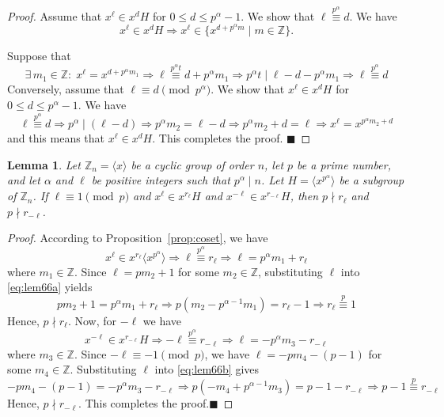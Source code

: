 \documentclass[12pt]{article}
\newtheorem{lem}[formula]{Lemma}
\begin{document}
  \begin{proof}
  	Assume that $x^\ell\in x^dH$ for $0\le d\le p^\alpha-1$. We show that $\ell\stackrel{p^\alpha}{\equiv} d$. We have
  	\[
  	x^\ell\in x^dH
  	\Longrightarrow
  	x^\ell\in\{x^{d+p^\alpha m}\mid m\in\mathbb Z\}.
  	\]
  	
  \noindent	Suppose that
  	\[
  	\exists\,m_1\in\mathbb Z:\;
  	x^\ell=x^{d+p^\alpha m_1}
  	\Longrightarrow
  	\ell \overset{p^\alpha t}{\equiv} d+p^\alpha m_1
  	\Longrightarrow
  	p^\alpha t\mid\ell-d-p^\alpha m_1
  	\Longrightarrow
  	\ell\stackrel{p^\alpha}{\equiv} d
  	\]
  \noindent	Conversely, assume that
  $\ell\equiv d\pmod{p^\alpha}$. We show that $x^\ell\in x^dH$ for $0\le d\le p^\alpha-1$. We have
  	\[
  	\ell\stackrel{p^\alpha}{\equiv} d
  	\Longrightarrow
  	p^\alpha\mid(\ell-d)
  	\Longrightarrow
  	p^\alpha m_2=\ell-d
  	\Longrightarrow
  	p^\alpha m_2+d=\ell
  	\Longrightarrow
  	x^\ell=x^{p^\alpha m_2+d}
  	\]
  \noindent	and this means that $x^\ell\in x^dH$. This completes the proof.
  \hfill$\blacksquare$
  \end{proof}
   \begin{lem}\label{nomulp}
  Let $\mathbb{Z}_n=\langle x\rangle$ be a cyclic group of order $n$, let $p$ be a prime number, and let $\alpha$ and $\ell$ be positive integers such that $p^\alpha\mid n$. Let $H=\langle x^{p^\alpha}\rangle$ be a subgroup of $\mathbb{Z}_n$. If $\ell\equiv1\pmod p$ and $x^\ell\in x^{r_\ell}H$ and $x^{-\ell}\in x^{r_{-\ell}}H$, then $p\nmid r_\ell$ and $p\nmid r_{-\ell}$.	
  \end{lem}
  \begin{proof}
  	According to Proposition~\ref{prop:coset}, we have
  	\begin{equation}\label{eq:lem66a}
  		x^\ell\in x^{r_\ell}\langle x^{p^\alpha}\rangle
  		\Longrightarrow
  		\ell\stackrel{p^\alpha}{\equiv} r_\ell
  		\Longrightarrow
  		\ell=p^\alpha m_1+r_\ell
  	\end{equation}
  	where $m_1\in\mathbb{Z}$. Since $\ell=pm_2+1$ for some $m_2\in\mathbb{Z}$, substituting $\ell$ into \eqref{eq:lem66a} yields
  	\[
  	pm_2+1=p^\alpha m_1+r_\ell
  	\Longrightarrow
  	p(m_2-p^{\alpha-1}m_1)=r_\ell-1
  	\Longrightarrow
  	r_\ell\stackrel{p}{\equiv} 1
  	\]
  	Hence, $p\nmid r_\ell$.
  	Now, for $-\ell$ we have
  	\begin{equation}\label{eq:lem66b}
  		x^{-\ell}\in x^{r_{-\ell}}H
  		\Longrightarrow
  		-\ell\stackrel{p^\alpha}{\equiv} r_{-\ell}	
  		\Longrightarrow
  		\ell=-p^\alpha m_3-r_{-\ell}
  	\end{equation}
  	where $m_3\in\mathbb{Z}$. Since $-\ell\equiv-1\pmod p$, we have $\ell=-pm_4-(p-1)$
  	for some $m_4\in\mathbb{Z}$. Substituting $\ell$ into \eqref{eq:lem66b} gives
  	\[
  	-pm_4-(p-1)=-p^\alpha m_3-r_{-\ell}
  	\Longrightarrow
  	p(-m_4+p^{\alpha-1}m_3)=p-1-r_{-\ell}
  	\Longrightarrow
  	p-1\stackrel{p}{\equiv} r_{-\ell}
  	\]
  	Hence, $p\nmid r_{-\ell}$.
   This completes the proof.\hfill$\blacksquare$
  \end{proof}
\end{document}
